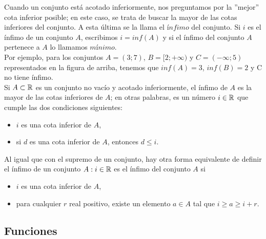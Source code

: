 \documentclass[../Teoría.root.tex]{subfiles}
\begin{document}
\begin{center}
    \begin{scaletikzpicturetowidth}{0.5\linewidth}
    \end{scaletikzpicturetowidth}
\end{center}
Cuando un conjunto está acotado inferiormente, nos preguntamos por la ”mejor” cota inferior posible; en este caso, se trata de buscar la mayor de las cotas inferiores del conjunto.
A esta última se la llama el \(\textit{ínfimo}\) del conjunto.
Si \(i\) es el ínfimo de un conjunto \(A\), escribimos \(i = inf(A)\) y si el ínfimo del conjunto \(A\) pertenece a \(A\) lo llamamos \(\textit{mínimo}\).\\
Por ejemplo, para los conjuntos \(A = (3; 7)\), \(B = [2; +\infty)\) y \(C = (−\infty; 5)\) representados en la figura de arriba, tenemos que \(inf(A) = 3\), \(inf(B) = 2\) y C no tiene ínfimo.\\
Si \(A \subset \mathbb{R}\) es un conjunto no vacío y acotado inferiormente, el ínfimo de \(A\) es la mayor de las cotas inferiores de \(A\); en otras palabras, es un número \(i \in \mathbb{R}\) que cumple las dos condiciones siguientes:
\begin{itemize}
    \item \(i\) es una cota inferior de \(A\),
    \item si \(d\) es una cota inferior de \(A\), entonces \(d \leq i\).
\end{itemize}
Al igual que con el supremo de un conjunto, hay otra forma equivalente de definir el ínfimo de un conjunto \(A: i \in \mathbb{R}\) es el ínfimo del conjunto \(A\) si
\begin{itemize}
    \item \(i\) es una cota inferior de \(A\),
    \item para cualquier \(r\) real positivo, existe un elemento \(a \in A\) tal que \(i \geq a \geq i + r\).
\end{itemize}
\subsection{Funciones}
\end{document}
